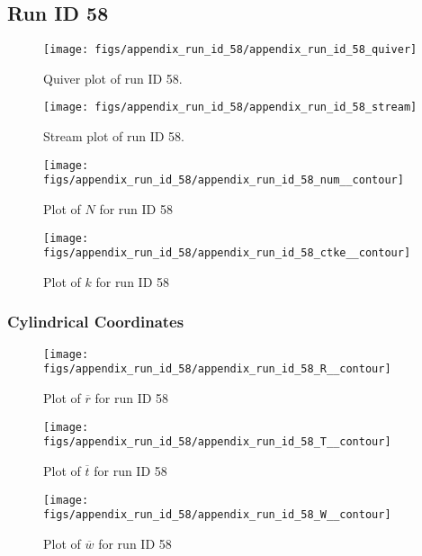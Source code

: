 \subsection{Run ID 58}
\begin{figure}[H]
\centering
\texttt{[image: figs/appendix\_run\_id\_58/appendix\_run\_id\_58\_quiver]}
\caption{Quiver plot of run ID 58.}
\label{fig:appendix_run_id_58_quiver}
\end{figure}


\begin{figure}[H]
\centering
\texttt{[image: figs/appendix\_run\_id\_58/appendix\_run\_id\_58\_stream]}
\caption{Stream plot of run ID 58.}
\label{fig:appendix_run_id_58_stream}
\end{figure}


\begin{figure}[H]
\centering
\texttt{[image: figs/appendix\_run\_id\_58/appendix\_run\_id\_58\_num\_\_contour]}
\caption{Plot of $N$ for run ID 58}
\label{fig:appendix_run_id_58_num__contour}
\end{figure}


\begin{figure}[H]
\centering
\texttt{[image: figs/appendix\_run\_id\_58/appendix\_run\_id\_58\_ctke\_\_contour]}
\caption{Plot of $k$ for run ID 58}
\label{fig:appendix_run_id_58_ctke__contour}
\end{figure}


\subsubsection{Cylindrical Coordinates}
\begin{figure}[H]
\centering
\texttt{[image: figs/appendix\_run\_id\_58/appendix\_run\_id\_58\_R\_\_contour]}
\caption{Plot of $\overline{r}$ for run ID 58}
\label{fig:appendix_run_id_58_R__contour}
\end{figure}


\begin{figure}[H]
\centering
\texttt{[image: figs/appendix\_run\_id\_58/appendix\_run\_id\_58\_T\_\_contour]}
\caption{Plot of $\overline{t}$ for run ID 58}
\label{fig:appendix_run_id_58_T__contour}
\end{figure}


\begin{figure}[H]
\centering
\texttt{[image: figs/appendix\_run\_id\_58/appendix\_run\_id\_58\_W\_\_contour]}
\caption{Plot of $\overline{w}$ for run ID 58}
\label{fig:appendix_run_id_58_W__contour}
\end{figure}


